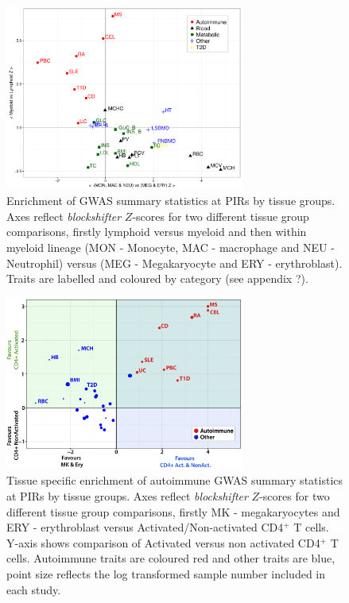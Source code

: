 \documentclass[a4paper,11pt]{report}
\begin{document}
\begin{figure}[h]
\centering
\includegraphics[width=0.7\textwidth]{block_shifter_scatter.pdf}
\caption{Enrichment of GWAS summary statistics at PIRs by tissue groups. Axes reflect \textit{blockshifter} $Z$-scores for two different tissue group comparisons, firstly lymphoid versus myeloid and then within myeloid lineage (MON - Monocyte, MAC - macrophage and NEU - Neutrophil) versus (MEG - Megakaryocyte and ERY - erythroblast). Traits are labelled and coloured by category (see appendix ?).}
\label{fig:bs_1}
\end{figure}

\begin{figure}[h]
\centering
\includegraphics[width=0.7\textwidth]{tcell_blockshifter_scatter.pdf}
\caption{Tissue specific enrichment of autoimmune GWAS summary statistics at PIRs by tissue groups. Axes reflect \textit{blockshifter} $Z$-scores for two different tissue group comparisons, firstly MK - megakaryocytes and ERY - erythroblast versus Activated/Non-activated CD4$^{+}$ T cells. Y-axis shows comparison of Activated versus non activated CD4$^{+}$ T cells. Autoimmune traits are coloured red and other traits are blue, point size reflects the log transformed sample number included in each study.}
\label{fig:bs_2}
\end{figure}
\end{document}
